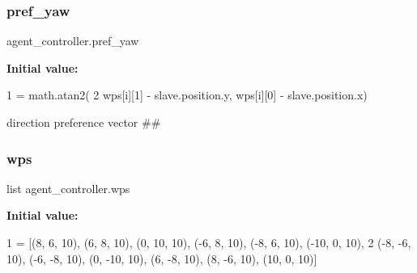 \subsubsection{\texorpdfstring{pref\+\_\+yaw}{pref\_yaw}}
{\footnotesize\ttfamily agent\+\_\+controller.\+pref\+\_\+yaw}

{\bfseries Initial value\+:}
\begin{DoxyCode}
1 =  math.atan2(
2             wps[i][1] - slave.position.y, wps[i][0] - slave.position.x)
\end{DoxyCode}


direction preference vector \#\# 

\mbox{\label{namespaceagent__controller_a9cdba1b55c324bd9d017fc050ebc822e}} 
\subsubsection{\texorpdfstring{wps}{wps}}
{\footnotesize\ttfamily list agent\+\_\+controller.\+wps}

{\bfseries Initial value\+:}
\begin{DoxyCode}
1 =  [(8, 6, 10), (6, 8, 10), (0, 10, 10), (-6, 8, 10), (-8, 6, 10), (-10, 0, 10),
2            (-8, -6, 10), (-6, -8, 10), (0, -10, 10), (6, -8, 10), (8, -6, 10), (10, 0, 10)]
\end{DoxyCode}
